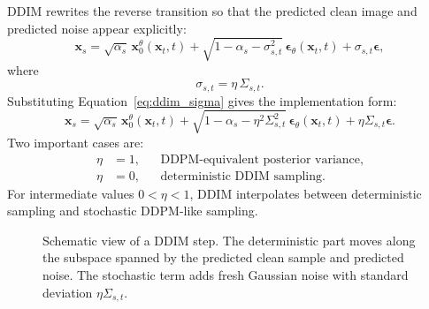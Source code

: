 \documentclass[11pt]{article}
\newcommand{\bx}{\mathbf{x}}
\newcommand{\beps}{\boldsymbol{\epsilon}}
\begin{document}
DDIM rewrites the reverse transition so that the predicted clean image and predicted noise appear
explicitly:
\begin{equation}
  \bx_s
  =
  \sqrt{\alpha_s}\,\bx_0^\theta(\bx_t,t)
  +
  \sqrt{1-\alpha_s-\sigma_{s,t}^2}\,\beps_\theta(\bx_t,t)
  +
  \sigma_{s,t}\beps,
  \label{eq:ddim_general}
\end{equation}
where
\begin{equation}
  \sigma_{s,t} = \eta\,\Sigma_{s,t}.
  \label{eq:ddim_sigma}
\end{equation}
Substituting Equation~\eqref{eq:ddim_sigma} gives the implementation form:
\begin{equation}
  \bx_s
  =
  \sqrt{\alpha_s}\,\bx_0^\theta(\bx_t,t)
  +
  \sqrt{1-\alpha_s-\eta^2\Sigma_{s,t}^2}\,\beps_\theta(\bx_t,t)
  +
  \eta\Sigma_{s,t}\beps.
  \label{eq:ddim_step}
\end{equation}
Two important cases are:
\begin{align}
  \eta &= 1, && \text{DDPM-equivalent posterior variance}, \\
  \eta &= 0, && \text{deterministic DDIM sampling}.
\end{align}
For intermediate values $0<\eta<1$, DDIM interpolates between deterministic sampling and stochastic
DDPM-like sampling.

\begin{figure}[t]
  \centering
  \caption{Schematic view of a DDIM step.  The deterministic part moves along the subspace spanned by the predicted clean sample and predicted noise.  The stochastic term adds fresh Gaussian noise with standard deviation $\eta\Sigma_{s,t}$.}
  \label{fig:ddim_step}
\end{figure}
\end{document}

